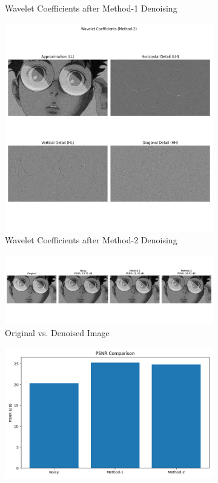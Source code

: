 \documentclass[12pt,a4paper]{article}
\begin{document}
\begin{figure}[H]
\begin{subfigure}[b]{0.48\textwidth}
    \caption{Wavelet Coefficients after Method-1 Denoising}
  \end{subfigure}
  \begin{subfigure}[b]{0.48\textwidth}
    \centering
    \includegraphics[width=\textwidth]{wavelet/coefficients_method2.png}
    \caption{Wavelet Coefficients after Method-2 Denoising}
  \end{subfigure}
  \begin{subfigure}[b]{0.48\textwidth}
    \centering
    \includegraphics[width=\textwidth]{wavelet/denoised_comparison.png}
    \caption{Original vs. Denoised Image}
  \end{subfigure}
  \begin{subfigure}[b]{0.48\textwidth}
    \centering
    \includegraphics[width=\textwidth]{wavelet/psnr_comparison.png}

\end{subfigure}
\end{figure}
\end{document}
